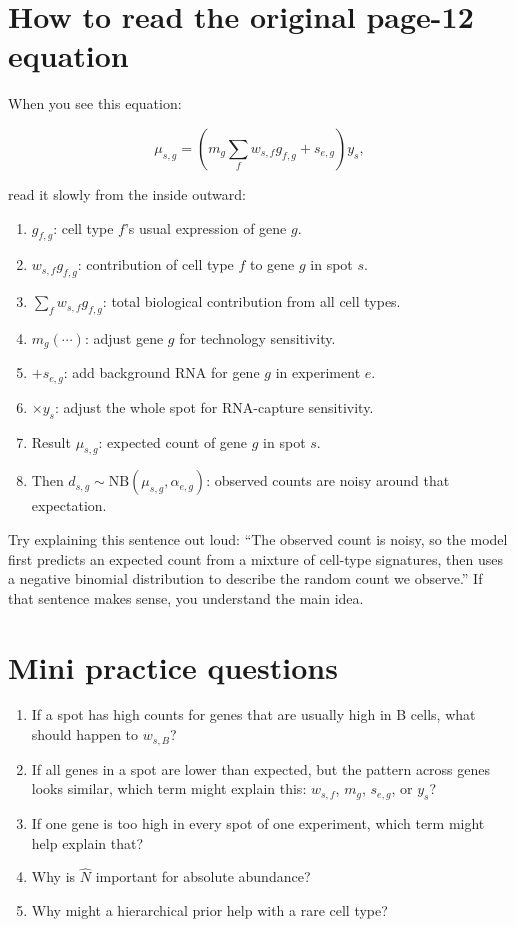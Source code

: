 \documentclass[11pt]{article}
\newcommand{\NB}{\mathrm{NB}}
\begin{document}
\section{How to read the original page-12 equation}

When you see this equation:

\[
\mu_{s,g}=\left(m_g\sum_f w_{s,f}g_{f,g}+s_{e,g}\right)y_s,
\]

read it slowly from the inside outward:

\begin{enumerate}
  \item $g_{f,g}$: cell type $f$'s usual expression of gene $g$.
  \item $w_{s,f}g_{f,g}$: contribution of cell type $f$ to gene $g$ in spot $s$.
  \item $\sum_f w_{s,f}g_{f,g}$: total biological contribution from all cell types.
  \item $m_g(\cdots)$: adjust gene $g$ for technology sensitivity.
  \item $+s_{e,g}$: add background RNA for gene $g$ in experiment $e$.
  \item $\times y_s$: adjust the whole spot for RNA-capture sensitivity.
  \item Result $\mu_{s,g}$: expected count of gene $g$ in spot $s$.
  \item Then $d_{s,g}\sim \NB(\mu_{s,g},\alpha_{e,g})$: observed counts are noisy around that expectation.
\end{enumerate}

\begin{checkpoint}
Try explaining this sentence out loud: ``The observed count is noisy, so the model first predicts an expected count from a mixture of cell-type signatures, then uses a negative binomial distribution to describe the random count we observe.'' If that sentence makes sense, you understand the main idea.
\end{checkpoint}

\section{Mini practice questions}

\begin{enumerate}
  \item If a spot has high counts for genes that are usually high in B cells, what should happen to $w_{s,B}$?
  \item If all genes in a spot are lower than expected, but the pattern across genes looks similar, which term might explain this: $w_{s,f}$, $m_g$, $s_{e,g}$, or $y_s$?
  \item If one gene is too high in every spot of one experiment, which term might help explain that?
  \item Why is $\hat N$ important for absolute abundance?
  \item Why might a hierarchical prior help with a rare cell type?
\end{enumerate}
\end{document}
